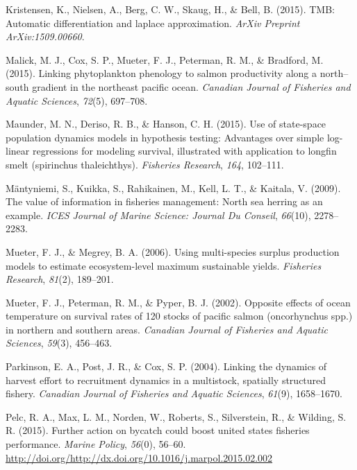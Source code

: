 \documentclass[12pt,]{scrartcl}
\begin{document}
\hypertarget{ref-kristensen2015tmb}{}
Kristensen, K., Nielsen, A., Berg, C. W., Skaug, H., \& Bell, B. (2015).
TMB: Automatic differentiation and laplace approximation. \emph{ArXiv
Preprint ArXiv:1509.00660}.

\hypertarget{ref-malick2015linking}{}
Malick, M. J., Cox, S. P., Mueter, F. J., Peterman, R. M., \& Bradford,
M. (2015). Linking phytoplankton phenology to salmon productivity along
a north--south gradient in the northeast pacific ocean. \emph{Canadian
Journal of Fisheries and Aquatic Sciences}, \emph{72}(5), 697--708.

\hypertarget{ref-maunder2015use}{}
Maunder, M. N., Deriso, R. B., \& Hanson, C. H. (2015). Use of
state-space population dynamics models in hypothesis testing: Advantages
over simple log-linear regressions for modeling survival, illustrated
with application to longfin smelt (spirinchus thaleichthys).
\emph{Fisheries Research}, \emph{164}, 102--111.

\hypertarget{ref-mantyniemi2009value}{}
Mäntyniemi, S., Kuikka, S., Rahikainen, M., Kell, L. T., \& Kaitala, V.
(2009). The value of information in fisheries management: North sea
herring as an example. \emph{ICES Journal of Marine Science: Journal Du
Conseil}, \emph{66}(10), 2278--2283.

\hypertarget{ref-mueter2006using}{}
Mueter, F. J., \& Megrey, B. A. (2006). Using multi-species surplus
production models to estimate ecosystem-level maximum sustainable
yields. \emph{Fisheries Research}, \emph{81}(2), 189--201.

\hypertarget{ref-mueter2002opposite}{}
Mueter, F. J., Peterman, R. M., \& Pyper, B. J. (2002). Opposite effects
of ocean temperature on survival rates of 120 stocks of pacific salmon
(oncorhynchus spp.) in northern and southern areas. \emph{Canadian
Journal of Fisheries and Aquatic Sciences}, \emph{59}(3), 456--463.

\hypertarget{ref-parkinson2004linking}{}
Parkinson, E. A., Post, J. R., \& Cox, S. P. (2004). Linking the
dynamics of harvest effort to recruitment dynamics in a multistock,
spatially structured fishery. \emph{Canadian Journal of Fisheries and
Aquatic Sciences}, \emph{61}(9), 1658--1670.

\hypertarget{ref-Pelc201556}{}
Pelc, R. A., Max, L. M., Norden, W., Roberts, S., Silverstein, R., \&
Wilding, S. R. (2015). Further action on bycatch could boost united
states fisheries performance. \emph{Marine Policy}, \emph{56}(0),
56--60.
\url{http://doi.org/http://dx.doi.org/10.1016/j.marpol.2015.02.002}
\end{document}
